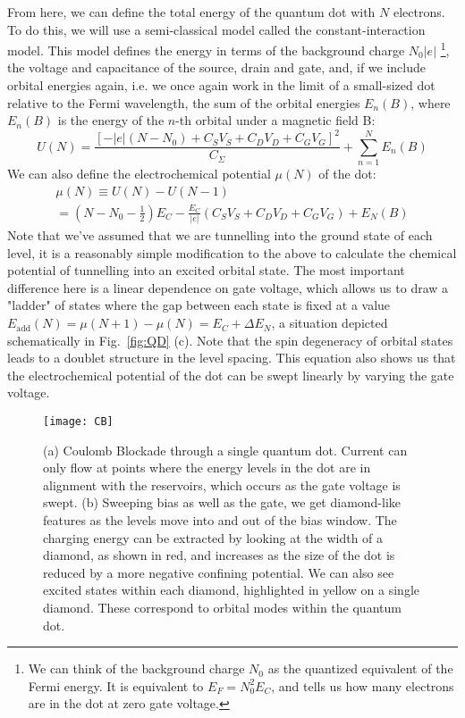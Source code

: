 From here, we can define the total energy of the quantum dot with $N$ electrons. To do this, we will use a
semi-classical model called the constant-interaction model. This model defines the energy in terms of the background charge $N_0|e|$
\footnote{We can think of the background charge $N_0$ as the quantized equivalent of the Fermi energy. It is equivalent
to $E_F = N_0^2 E_C$, and tells us how many electrons are in the dot at zero gate voltage.},
the voltage and capacitance of the source, drain and gate, and, if we include orbital energies again, i.e. we once again work
in the limit of a small-sized dot relative to the Fermi wavelength, the sum of the orbital energies $E_n(B)$, where
$E_n(B)$ is the energy of the $n$-th orbital under a magnetic field B:
\begin{equation}
  U(N) = \frac{[-|e|(N-N_0) + C_SV_S + C_DV_D + C_GV_G]^2}{C_\Sigma} + \sum_{n=1}^N E_n(B)
\end{equation}
We can also define the electrochemical potential $\mu(N)$ of the dot:
\begin{multline}
  \mu(N) \equiv U(N) - U(N-1) \\
    = \left(N - N_0 - \tfrac{1}{2}\right)E_C - \frac{E_C}{|e|}\left(C_SV_S + C_DV_D + C_GV_G\right) + E_N(B)
\end{multline}
Note that we've assumed that we are tunnelling into the ground state of each level, it is a reasonably
simple modification to the above to calculate the chemical potential of tunnelling into an excited orbital
state. The most important difference here is a linear dependence on gate voltage, which allows us to draw
a "ladder" of states where the gap between each state is fixed at a value $E_{\textrm{add}}(N) = \mu(N+1) - \mu(N) = E_C + \Delta E_N$,
a situation depicted schematically in Fig.~\ref{fig:QD} (c). Note that the spin degeneracy of orbital states
leads to a doublet structure in the level spacing. This equation also shows us that the electrochemical potential
of the dot can be swept linearly by varying the gate voltage.

\begin{figure}
  \texttt{[image: CB]}
  \caption[Coulomb Blockade in a Single Quantum Dot]
  {\label{fig:cbtrans}(a) Coulomb Blockade through a single quantum dot. Current can only flow at points
  where the energy levels in the dot are in alignment with the reservoirs, which occurs as the gate voltage
  is swept. (b) Sweeping bias as well as the gate, we get diamond-like features as the levels move into
  and out of the bias window. The charging energy can be extracted by looking at the width of a diamond, as
  shown in red, and increases as the size of the dot is reduced by a more negative confining potential. We can
  also see excited states within each diamond, highlighted in yellow on a single diamond. These correspond to orbital
  modes within the quantum dot.
  }
\end{figure}

